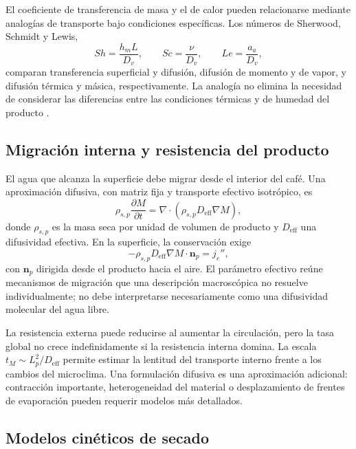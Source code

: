 El coeficiente de transferencia de masa y el de calor pueden relacionarse mediante analogías de transporte bajo condiciones específicas. Los números de Sherwood, Schmidt y Lewis,
\begin{equation}
Sh=\frac{h_m L}{D_v},
\qquad
Sc=\frac{\nu}{D_v},
\qquad
Le=\frac{a_a}{D_v},
\label{eq:adimensionales_masa}
\end{equation}
comparan transferencia superficial y difusión, difusión de momento y de vapor, y difusión térmica y másica, respectivamente. La analogía no elimina la necesidad de considerar las diferencias entre las condiciones térmicas y de humedad del producto \cite{bergman2017}.

\subsection{Migración interna y resistencia del producto}

El agua que alcanza la superficie debe migrar desde el interior del café. Una aproximación difusiva, con matriz fija y transporte efectivo isotrópico, es
\begin{equation}
\rho_{s,p}\frac{\partial M}{\partial t}
=\nabla\cdot\left(\rho_{s,p}D_{\mathrm{eff}}\nabla M\right),
\label{eq:diffusion_humedad_producto}
\end{equation}
donde $\rho_{s,p}$ es la masa seca por unidad de volumen de producto y $D_{\mathrm{eff}}$ una difusividad efectiva. En la superficie, la conservación exige
\begin{equation}
-\rho_{s,p}D_{\mathrm{eff}}\nabla M\cdot\mathbf n_p=j_e'',
\label{eq:frontera_humedad_producto}
\end{equation}
con $\mathbf n_p$ dirigida desde el producto hacia el aire. El parámetro efectivo reúne mecanismos de migración que una descripción macroscópica no resuelve individualmente; no debe interpretarse necesariamente como una difusividad molecular del agua libre.

La resistencia externa puede reducirse al aumentar la circulación, pero la tasa global no crece indefinidamente si la resistencia interna domina. La escala $t_M\sim L_p^2/D_{\mathrm{eff}}$ permite estimar la lentitud del transporte interno frente a los cambios del microclima. Una formulación difusiva es una aproximación adicional: contracción importante, heterogeneidad del material o desplazamiento de frentes de evaporación pueden requerir modelos más detallados.

\subsection{Modelos cinéticos de secado}
\label{subsec:cinetica_secado}

